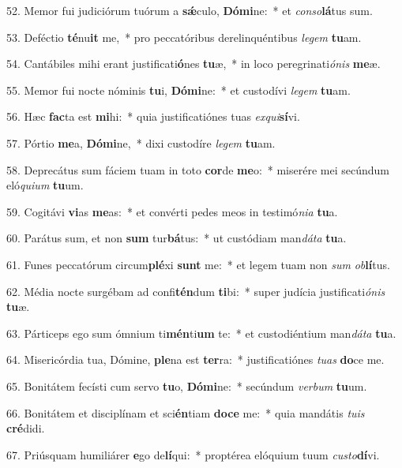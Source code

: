 52. Memor fui judiciórum tuórum a \textbf{sǽ}culo, \textbf{Dó}\textbf{mi}ne:~*  et \textit{con}\textit{so}\textbf{lá}tus sum.\

53. Deféctio \textbf{té}nu\textbf{it} me,~*  pro peccatóribus derelinquéntibus \textit{le}\textit{gem} \textbf{tu}am.\

54. Cantábiles mihi erant justificati\textbf{ó}nes \textbf{tu}æ,~*  in loco peregrinati\textit{ó}\textit{nis} \textbf{me}æ.\

55. Memor fui nocte nóminis \textbf{tu}i, \textbf{Dó}\textbf{mi}ne:~*  et custodívi \textit{le}\textit{gem} \textbf{tu}am.\

56. Hæc \textbf{fac}ta est \textbf{mi}hi:~*  quia justificatiónes tuas \textit{ex}\textit{qui}\textbf{sí}vi.\

57. Pórtio \textbf{me}a, \textbf{Dó}\textbf{mi}ne,~*  dixi custodíre \textit{le}\textit{gem} \textbf{tu}am.\

58. Deprecátus sum fáciem tuam in toto \textbf{cor}de \textbf{me}o:~*  miserére mei secúndum eló\textit{qui}\textit{um} \textbf{tu}um.\

59. Cogitávi \textbf{vi}as \textbf{me}as:~*  et convérti pedes meos in testimó\textit{ni}\textit{a} \textbf{tu}a.\

60. Parátus sum, et non \textbf{sum} tur\textbf{bá}tus:~*  ut custódiam man\textit{dá}\textit{ta} \textbf{tu}a.\

61. Funes peccatórum circum\textbf{plé}xi \textbf{sunt} me:~*  et legem tuam non \textit{sum} \textit{ob}\textbf{lí}tus.\

62. Média nocte surgébam ad confi\textbf{tén}dum \textbf{ti}bi:~*  super judícia justificati\textit{ó}\textit{nis} \textbf{tu}æ.\

63. Párticeps ego sum ómnium ti\textbf{mén}ti\textbf{um} te:~*  et custodiéntium man\textit{dá}\textit{ta} \textbf{tu}a.\

64. Misericórdia tua, Dómine, \textbf{ple}na est \textbf{ter}ra:~*  justificatiónes \textit{tu}\textit{as} \textbf{do}ce me.\

65. Bonitátem fecísti cum servo \textbf{tu}o, \textbf{Dó}\textbf{mi}ne:~*  secúndum \textit{ver}\textit{bum} \textbf{tu}um.\

66. Bonitátem et disciplínam et sci\textbf{én}tiam \textbf{do}\textbf{ce} me:~*  quia mandátis \textit{tu}\textit{is} \textbf{cré}didi.\

67. Priúsquam humiliárer \textbf{e}go de\textbf{lí}qui:~*  proptérea elóquium tuum \textit{cus}\textit{to}\textbf{dí}vi.\


